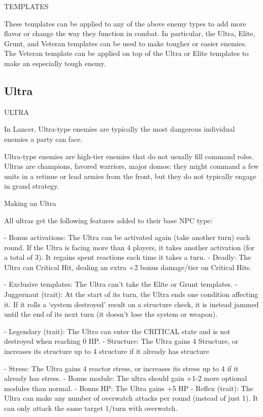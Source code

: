                                        TEMPLATES
 

These templates can be applied to any of the above enemy types to add more flavor or change  
the way they function in combat. In particular, the Ultra, Elite, Grunt, and Veteran templates can  
be used to make tougher or easier enemies. The Veteran template can be applied on top of the  
Ultra or Elite templates to make an especially tough enemy.
 
\subsection{Ultra}
                                                   ULTRA  

In Lancer, Ultra-type enemies are typically the most dangerous individual enemies a party can  
face.   

Ultra-type enemies are high-tier enemies that do not usually fill command roles. Ultras are  
champions, favored warriors, major domos: they might command a few units in a retinue or lead  
armies from the front, but they do not typically engage in grand strategy.    

Making an Ultra
 
All ultras get the following features added to their base NPC type:
 
    -    Bonus activations: The Ultra can be activated again (take another turn) each round. If  
        the Ultra is facing more than 4 players, it takes another activation (for a total of 3). It  
         regains spent reactions each time it takes a turn.  
    -    Deadly: The Ultra can Critical Hit, dealing an extra +2 bonus damage/tier on Critical Hits.
 
    -    Exclusive templates: The Ultra can’t take the Elite or Grunt templates.  
    -   Juggernaut (trait): At the start of its turn, the Ultra ends one condition affecting it. If it  
         rolls a ‘system destroyed’ result on a structure check, it is instead jammed until the end of  
         its next turn (it doesn’t lose the system or weapon).
 
    -    Legendary (trait): The Ultra can enter the CRITICAL state and is not destroyed when  
         reaching 0 HP.  
    -   Structure: The Ultra gains 4 Structure, or increases its structure up to 4 structure if it  
         already has structure
 
    -   Stress: The Ultra gains 4 reactor stress, or increases its stress up to 4 if it already has  
        stress.  
    -    Bonus module: The ultra should gain +1-2 more optional modules than normal.  
    -    Bonus HP: The Ultra gains +5 HP  
    -    Reflex (trait): The Ultra can make any number of overwatch attacks per round (instead of  
        just 1). It can only attack the same target 1/turn with overwatch.  


